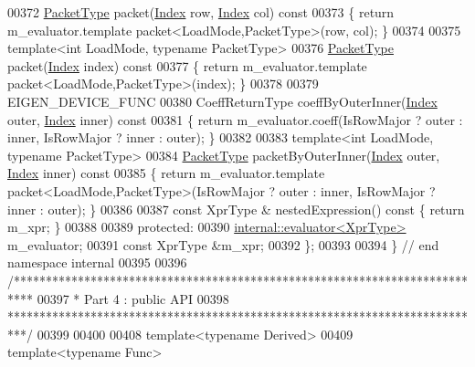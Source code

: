 \begin{DoxyCode}
00372   \hyperlink{struct_eigen_1_1_packet_type}{PacketType} packet(\hyperlink{namespace_eigen_a62e77e0933482dafde8fe197d9a2cfde}{Index} row, \hyperlink{namespace_eigen_a62e77e0933482dafde8fe197d9a2cfde}{Index} col)\textcolor{keyword}{ const}
00373 \textcolor{keyword}{  }\{ \textcolor{keywordflow}{return} m\_evaluator.template packet<LoadMode,PacketType>(row, col); \}
00374 
00375   \textcolor{keyword}{template}<\textcolor{keywordtype}{int} LoadMode, \textcolor{keyword}{typename} PacketType>
00376   \hyperlink{struct_eigen_1_1_packet_type}{PacketType} packet(\hyperlink{namespace_eigen_a62e77e0933482dafde8fe197d9a2cfde}{Index} index)\textcolor{keyword}{ const}
00377 \textcolor{keyword}{  }\{ \textcolor{keywordflow}{return} m\_evaluator.template packet<LoadMode,PacketType>(index); \}
00378   
00379   EIGEN\_DEVICE\_FUNC
00380   CoeffReturnType coeffByOuterInner(\hyperlink{namespace_eigen_a62e77e0933482dafde8fe197d9a2cfde}{Index} outer, \hyperlink{namespace_eigen_a62e77e0933482dafde8fe197d9a2cfde}{Index} inner)\textcolor{keyword}{ const}
00381 \textcolor{keyword}{  }\{ \textcolor{keywordflow}{return} m\_evaluator.coeff(IsRowMajor ? outer : inner, IsRowMajor ? inner : outer); \}
00382   
00383   \textcolor{keyword}{template}<\textcolor{keywordtype}{int} LoadMode, \textcolor{keyword}{typename} PacketType>
00384   \hyperlink{struct_eigen_1_1_packet_type}{PacketType} packetByOuterInner(\hyperlink{namespace_eigen_a62e77e0933482dafde8fe197d9a2cfde}{Index} outer, \hyperlink{namespace_eigen_a62e77e0933482dafde8fe197d9a2cfde}{Index} inner)\textcolor{keyword}{ const}
00385 \textcolor{keyword}{  }\{ \textcolor{keywordflow}{return} m\_evaluator.template packet<LoadMode,PacketType>(IsRowMajor ? outer : inner, IsRowMajor ? inner 
      : outer); \}
00386   
00387   \textcolor{keyword}{const} XprType & nestedExpression()\textcolor{keyword}{ const }\{ \textcolor{keywordflow}{return} m\_xpr; \}
00388   
00389 \textcolor{keyword}{protected}:
00390   \hyperlink{struct_eigen_1_1internal_1_1evaluator}{internal::evaluator<XprType>} m\_evaluator;
00391   \textcolor{keyword}{const} XprType &m\_xpr;
00392 \};
00393 
00394 \} \textcolor{comment}{// end namespace internal}
00395 
00396 \textcolor{comment}{/***************************************************************************}
00397 \textcolor{comment}{* Part 4 : public API}
00398 \textcolor{comment}{***************************************************************************/}
00399 
00400 
00408 \textcolor{keyword}{template}<\textcolor{keyword}{typename} Derived>
00409 \textcolor{keyword}{template}<\textcolor{keyword}{typename} Func>

\end{DoxyCode}
